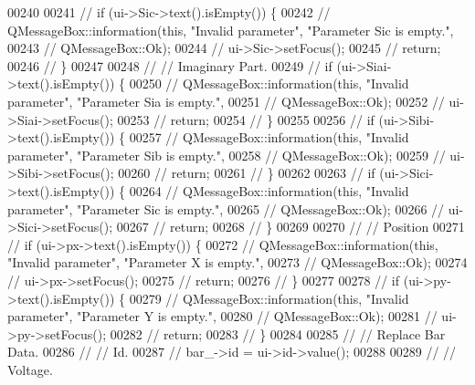 \begin{DoxyCode}
00240 
00241 \textcolor{comment}{//  if (ui->Sic->text().isEmpty()) \{}
00242 \textcolor{comment}{//    QMessageBox::information(this, "Invalid parameter", "Parameter Sic is empty.",}
00243 \textcolor{comment}{//                             QMessageBox::Ok);}
00244 \textcolor{comment}{//    ui->Sic->setFocus();}
00245 \textcolor{comment}{//    return;}
00246 \textcolor{comment}{//  \}}
00247 
00248 \textcolor{comment}{//  // Imaginary Part.}
00249 \textcolor{comment}{//  if (ui->Siai->text().isEmpty()) \{}
00250 \textcolor{comment}{//    QMessageBox::information(this, "Invalid parameter", "Parameter Sia is empty.",}
00251 \textcolor{comment}{//                             QMessageBox::Ok);}
00252 \textcolor{comment}{//    ui->Siai->setFocus();}
00253 \textcolor{comment}{//    return;}
00254 \textcolor{comment}{//  \}}
00255 
00256 \textcolor{comment}{//  if (ui->Sibi->text().isEmpty()) \{}
00257 \textcolor{comment}{//    QMessageBox::information(this, "Invalid parameter", "Parameter Sib is empty.",}
00258 \textcolor{comment}{//                             QMessageBox::Ok);}
00259 \textcolor{comment}{//    ui->Sibi->setFocus();}
00260 \textcolor{comment}{//    return;}
00261 \textcolor{comment}{//  \}}
00262 
00263 \textcolor{comment}{//  if (ui->Sici->text().isEmpty()) \{}
00264 \textcolor{comment}{//    QMessageBox::information(this, "Invalid parameter", "Parameter Sic is empty.",}
00265 \textcolor{comment}{//                             QMessageBox::Ok);}
00266 \textcolor{comment}{//    ui->Sici->setFocus();}
00267 \textcolor{comment}{//    return;}
00268 \textcolor{comment}{//  \}}
00269 
00270 \textcolor{comment}{//  // Position}
00271 \textcolor{comment}{//  if (ui->px->text().isEmpty()) \{}
00272 \textcolor{comment}{//    QMessageBox::information(this, "Invalid parameter", "Parameter X is empty.",}
00273 \textcolor{comment}{//                             QMessageBox::Ok);}
00274 \textcolor{comment}{//    ui->px->setFocus();}
00275 \textcolor{comment}{//    return;}
00276 \textcolor{comment}{//  \}}
00277 
00278 \textcolor{comment}{//  if (ui->py->text().isEmpty()) \{}
00279 \textcolor{comment}{//    QMessageBox::information(this, "Invalid parameter", "Parameter Y is empty.",}
00280 \textcolor{comment}{//                             QMessageBox::Ok);}
00281 \textcolor{comment}{//    ui->py->setFocus();}
00282 \textcolor{comment}{//    return;}
00283 \textcolor{comment}{//  \}}
00284 
00285 \textcolor{comment}{//  // Replace Bar Data.}
00286 \textcolor{comment}{//  // Id.}
00287 \textcolor{comment}{//  bar\_->id = ui->id->value();}
00288 
00289 \textcolor{comment}{//  // Voltage.}

\end{DoxyCode}

